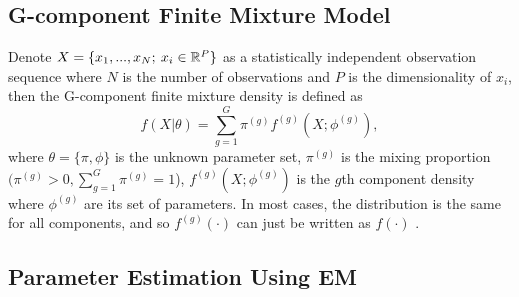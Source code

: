 \subsection{G-component Finite Mixture Model}
\label{sec:gcomponentmixturedensity}
Denote \(X=\{x_1, ..., x_N; \: x_i \in \mathbb{R}^P\}\) as a statistically independent observation sequence where \(N\) is the number of observations and \(P\) is the dimensionality of \(x_i\), then the G-component finite mixture density is defined as 
\[
    f(X|\theta) = \sum_{g=1}^{G} \pi^{(g)} f^{(g)}(X; \phi^{(g)}),
\]
where \(\theta=\{\pi, \phi\}\) is the unknown parameter set, \(\pi^{(g)}\) is the mixing proportion \((\pi^{(g)} > 0, \sum_{g=1}^{G} \pi^{(g)}=1\)), \(f^{(g)}(X; \phi^{(g)})\) is the \(g\)th component density where \(\phi^{(g)}\) are its set of parameters. In most cases, the distribution is the same for all components, and so \(f^{(g)}(\cdot)\) can just be written as $f(\cdot)$ \cite{Mcnicholas2016}.

\subsection{Parameter Estimation Using EM}
\label{sec:em}
    
    
